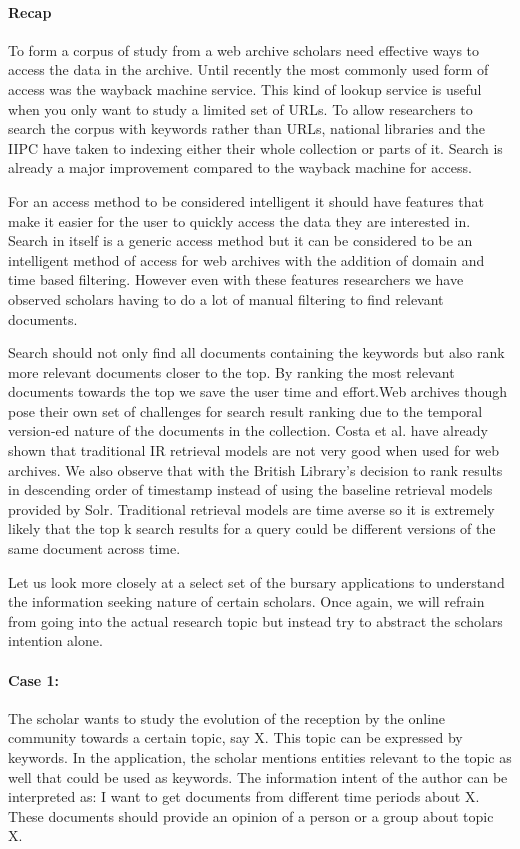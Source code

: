 \paragraph{Recap} %
\label{par:recap}
To form a corpus of study from a web archive scholars need effective ways to access the data in the archive. Until recently the most commonly used form of access was the wayback machine service. This kind of lookup service is useful when you only want to study a limited set of URLs. To allow researchers to search the corpus with keywords rather than URLs, national libraries and the IIPC have taken to indexing either their whole collection or parts of it. Search is already a major improvement compared to the wayback machine for access. 

For an access method to be considered intelligent it should have features that make it easier for the user to quickly access the data they are interested in. Search in itself is a generic access method but it can be considered to be an intelligent method of access for web archives with the addition of domain and time based filtering. However even with these features researchers we have observed scholars having to do a lot of manual filtering to find relevant documents.

Search should not only find all documents containing the keywords but also rank more relevant documents closer to the top. By ranking the most relevant documents towards the top we save the user time and effort.Web archives though pose their own set of challenges for search result ranking due to the temporal version-ed nature of the documents in the collection. Costa et al. have already shown that traditional IR retrieval models are not very good when used for web archives. We also observe that with the British Library's decision to rank results in descending order of timestamp instead of using the baseline retrieval models provided by Solr. Traditional retrieval models are time averse so it is extremely likely that the top k search results for a query could be different versions of the same document across time.

Let us look more closely at a select set of the bursary applications to understand the information seeking nature of certain scholars. Once again, we will refrain from going into the actual research topic but instead try to abstract the scholars intention alone.

\paragraph{Case 1:} %
\label{par:paragraph_name}
The scholar wants to study the evolution of the reception by the online community towards a certain topic, say X. This topic can be expressed by keywords. In the application, the scholar mentions entities relevant to the topic as well that could be used as keywords. The information intent of the author can be interpreted as: I want to get documents from different time periods about X. These documents should provide an opinion of a person or a group about topic X.

